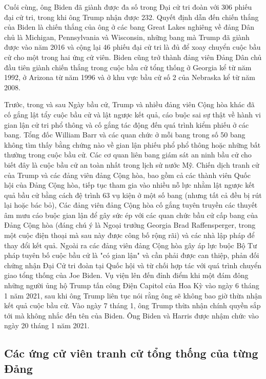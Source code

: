 \documentclass[14pt, a4paper]{article}
\numberwithin{equation}{section}
\numberwithin{figure}{section}
\numberwithin{dl}{section}
\numberwithin{md}{section}
\numberwithin{bd}{section}
\numberwithin{dn}{section}
\numberwithin{hq}{section}
\begin{document}
    Cuối cùng, ông Biden đã giành được đa số trong Đại cử tri đoàn với 306 phiếu đại cử tri, trong khi ông Trump nhận được 232. 
    Quyết định dẫn đến chiến thắng của Biden là chiến thắng của ông ở các bang Great Lakes nghiêng về đảng Dân chủ là Michigan, Pennsylvania và Wisconsin, những bang mà Trump đã giành được vào năm 2016 và cộng lại 46 phiếu đại cử tri là đủ để xoay chuyển cuộc bầu cử cho một trong hai ứng cử viên. 
    Biden cũng trở thành đảng viên Đảng Dân chủ đầu tiên giành chiến thắng trong cuộc bầu cử tổng thống ở Georgia kể từ năm 1992, ở Arizona từ năm 1996 và ở khu vực bầu cử số 2 của Nebraska kể từ năm 2008.

    Trước, trong và sau Ngày bầu cử, Trump và nhiều đảng viên Cộng hòa khác đã cố gắng lật tẩy cuộc bầu cử và lật ngược kết quả, cáo buộc sai sự thật về hành vi gian lận cử tri phổ thông và cố gắng tác động đến quá trình kiểm phiếu ở các bang. 
    Tổng đốc William Barr và các quan chức ở mỗi bang trong số 50 bang không tìm thấy bằng chứng nào về gian lận phiếu phổ phổ thông hoặc những bất thường trong cuộc bầu cử. 
    Các cơ quan liên bang giám sát an ninh bầu cử cho biết đây là cuộc bầu cử an toàn nhất trong lịch sử nước Mỹ. 
    Chiến dịch tranh cử của Trump và các đảng viên đảng Cộng hòa, bao gồm cả các thành viên Quốc hội của Đảng Cộng hòa, tiếp tục tham gia vào nhiều nỗ lực nhằm lật ngược kết quả bầu cử bằng cách đệ trình 63 vụ kiện ở một số bang (nhưng tất cả đều bị rút lại hoặc bác bỏ), 
    Các đảng viên đảng Cộng hòa cố gắng tuyên truyền các thuyết âm mưu cáo buộc gian lận để gây sức ép với các quan chức bầu cử cấp bang của Đảng Cộng hòa (đáng chú ý là Ngoại trưởng Georgia Brad Raffensperger, trong một cuộc điện thoại mà sau này được công bố rộng rãi) và các nhà lập pháp để thay đổi kết quả.
    Ngoài ra các đảng viên đảng Cộng hòa gây áp lực buộc Bộ Tư pháp tuyên bố cuộc bầu cử là "có gian lận" và cần phải được can thiệp, phản đối chứng nhận Đại Cử tri đoàn tại Quốc hội và từ chối hợp tác với quá trình chuyển giao tổng thống của Joe Biden. 
    Vụ viện lên đến đỉnh điểm khi một đám đông những người ủng hộ Trump tấn công Điện Capitol của Hoa Kỳ vào ngày 6 tháng 1 năm 2021, sau khi ông Trump liên tục nói rằng ông sẽ không bao giờ thừa nhận kết quả cuộc bầu cử. 
    Vào ngày 7 tháng 1, ông Trump thừa nhận chính quyền sắp tới mà không nhắc đến tên của Biden.
    Ông Biden và Harris được nhậm chức vào ngày 20 tháng 1 năm 2021.

    \subsection{Các ứng cử viên tranh cử tổng thống của từng Đảng}
\end{document}
